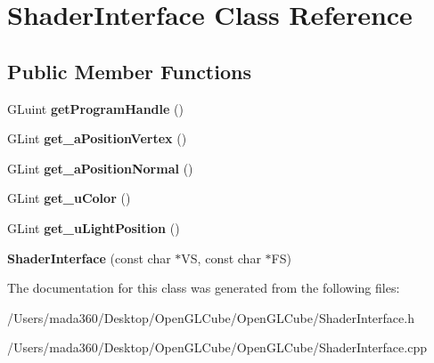 \hypertarget{class_shader_interface}{}\section{Shader\+Interface Class Reference}
\label{class_shader_interface}
\subsection*{Public Member Functions}
\begin{DoxyCompactItemize}
\item 
\hypertarget{class_shader_interface_ab76abfacd0faa9f2693ee9547e0c4016}{}G\+Luint {\bfseries get\+Program\+Handle} ()\label{class_shader_interface_ab76abfacd0faa9f2693ee9547e0c4016}

\item 
\hypertarget{class_shader_interface_a17097abf04090cfb6cbc223daf76b741}{}G\+Lint {\bfseries get\+\_\+a\+Position\+Vertex} ()\label{class_shader_interface_a17097abf04090cfb6cbc223daf76b741}

\item 
\hypertarget{class_shader_interface_a488d0fcdc9a9e8a1a8fe56bbf60da5b8}{}G\+Lint {\bfseries get\+\_\+a\+Position\+Normal} ()\label{class_shader_interface_a488d0fcdc9a9e8a1a8fe56bbf60da5b8}

\item 
\hypertarget{class_shader_interface_a0b9c60cbfcb284eb24c5ac699ead9da6}{}G\+Lint {\bfseries get\+\_\+u\+Color} ()\label{class_shader_interface_a0b9c60cbfcb284eb24c5ac699ead9da6}

\item 
\hypertarget{class_shader_interface_a90eda5821dd16e1293b436ab7d935ea4}{}G\+Lint {\bfseries get\+\_\+u\+Light\+Position} ()\label{class_shader_interface_a90eda5821dd16e1293b436ab7d935ea4}

\item 
\hypertarget{class_shader_interface_af926096762c79e3333cc6bde76f28271}{}{\bfseries Shader\+Interface} (const char $\ast$V\+S, const char $\ast$F\+S)\label{class_shader_interface_af926096762c79e3333cc6bde76f28271}

\end{DoxyCompactItemize}


The documentation for this class was generated from the following files\+:\begin{DoxyCompactItemize}
\item 
/\+Users/mada360/\+Desktop/\+Open\+G\+L\+Cube/\+Open\+G\+L\+Cube/Shader\+Interface.\+h\item 
/\+Users/mada360/\+Desktop/\+Open\+G\+L\+Cube/\+Open\+G\+L\+Cube/Shader\+Interface.\+cpp\end{DoxyCompactItemize}

